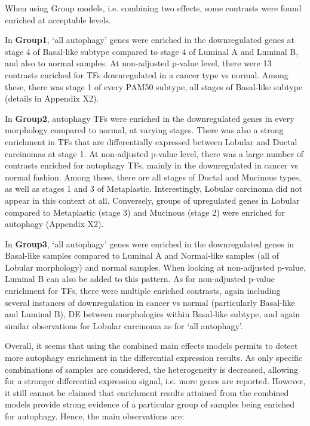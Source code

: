         \vspace{5mm}
        When using Group models, i.e. combining two effects, some contrasts were found enriched at acceptable levels.
        
        In \textbf{Group1}, ‘all autophagy’ genes were enriched in the downregulated genes at stage 4 of Basal-like subtype compared to stage 4 of Luminal A and Luminal B, and also to normal samples. At non-adjusted p-value level, there were 13 contrasts enriched for TFs downregulated in a cancer type vs normal. Among these, there was stage 1 of every PAM50 subtype, all stages of Basal-like subtype (details in Appendix X2). 
         
        In \textbf{Group2}, autophagy TFs were enriched in the downregulated genes in every morphology compared to normal, at varying stages. There was also a strong enrichment in TFs that are differentially expressed between Lobular and Ductal carcinomas at stage 1. At non-adjusted p-value level, there was a large number of contrasts enriched for autophagy TFs, mainly in the downregulated in cancer vs normal fashion. Among these, there are all stages of Ductal and Mucinous types, as well as stages 1 and 3 of Metaplastic. Interestingly, Lobular carcinoma did not appear in this context at all. Conversely, groups of upregulated genes in Lobular compared to Metaplastic (stage 3) and Mucinous (stage 2) were enriched for autophagy (Appendix X2). 
        
        In \textbf{Group3}, ‘all autophagy’ genes were enriched in the downregulated genes in Basal-like samples compared to Luminal A and Normal-like samples (all of Lobular morphology) and normal samples. When looking at non-adjusted p-value, Luminal B can also be added to this pattern. As for non-adjusted p-value enrichment for TFs, there were multiple enriched contrasts, again including several instances of downregulation in cancer vs normal (particularly Basal-like and Luminal B), DE between morphologies within Basal-like subtype, and again similar observations for Lobular carcinoma as for ‘all autophagy’.
        
        \newpage
        Overall, it seems that using the combined main effects models permits to detect more autophagy enrichment in the differential expression results. As only specific combinations of samples are considered, the heterogeneity is decreased, allowing for a stronger differential expression signal, i.e. more genes are reported. However, it still cannot be claimed that enrichment results attained from the combined models provide strong evidence of a particular group of samples being enriched for autophagy. Hence, the main observations are:
        
